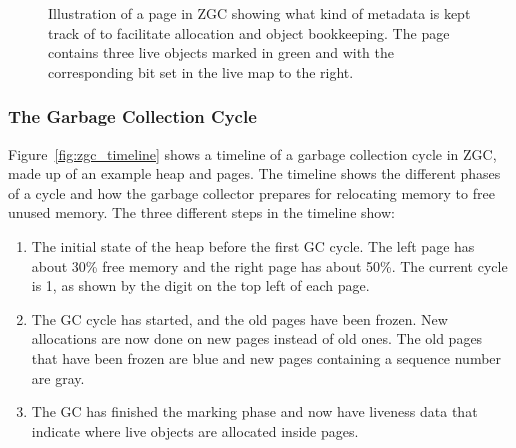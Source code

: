 \begin{figure}[H]
    \centering
    
    \caption{Illustration of a page in ZGC showing what kind of metadata is kept track of to facilitate allocation and object bookkeeping. The page contains three live objects marked in green and with the corresponding bit set in the live map to the right.} 
    \label{fig:zpages}
\end{figure}

\subsubsection{The Garbage Collection Cycle}

Figure~\ref{fig:zgc_timeline} shows a timeline of a garbage collection cycle in ZGC, made up of an example heap and pages. The timeline shows the different phases of a cycle and how the garbage collector prepares for relocating memory to free unused memory. The three different steps in the timeline show:

\vspace*{-0.4cm}

\begin{enumerate}[label=\alph*)]
    \item The initial state of the heap before the first GC cycle. The left page has about 30\% free memory and the right page has about 50\%. The current cycle is 1, as shown by the digit on the top left of each page.
    \item The GC cycle has started, and the old pages have been frozen. New allocations are now done on new pages instead of old ones. The old pages that have been frozen are blue and new pages containing a sequence number are gray.
    \item The GC has finished the marking phase and now have liveness data that indicate where live objects are allocated inside pages.
\end{enumerate}

\vspace*{-0.4cm}

